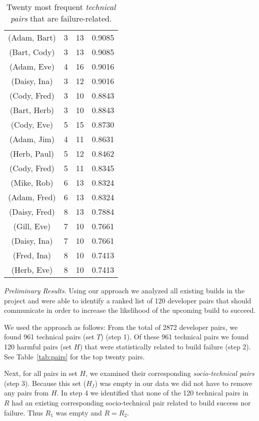 \begin{table}[t]
\begin{tabular}{@{\hspace{.2cm}}ccc@{\hspace{.75cm}}c@{\hspace{.2cm}}}
(Adam, Bart)	&	3&	13&	0.9085	\\ %
(Bart, Cody)	&	3&	13&	0.9085	\\ %
(Adam, Eve)	&	4&	16&	0.9016	\\ %
(Daisy, Ina)	&	3&	12&	0.9016	\\ %
(Cody, Fred)	&	3&	10&	0.8843	\\ %
(Bart, Herb)	&	3&	10&	0.8843	\\ %
(Cody, Eve)	&	5&	15&	0.8730	\\ %
(Adam, Jim)	&	4&	11&	0.8631	\\ %
(Herb, Paul)	&	5&	12&	0.8462	\\ %
(Cody, Fred)	&	5&	11&	0.8345	\\ %
(Mike, Rob)	&	6&	13&	0.8324	\\ %
(Adam, Fred)	&	6&	13&	0.8324	\\ %
(Daisy, Fred)	&	8&	13&	0.7884	\\ %
(Gill, Eve)		&	7&	10&	0.7661	\\ %
(Daisy, Ina)	&	7&	10&	0.7661	\\ %
(Fred, Ina)	&	8&	10&	0.7413	\\ %
(Herb, Eve)	&	8&	10&	0.7413	\\ %
\bottomrule
\end{tabular}
\caption{Twenty most frequent \emph{technical pairs} that are failure-related.}
\label{tab:badtechpairs}
\end{table}

\emph{Preliminary Results.}
Using our approach we analyzed all existing builds in the project and were able to identify a ranked list of 120 developer pairs that should communicate in order to increase the likelihood of the upcoming build to succeed. 

We used the approach as follows: From the total of 2872 developer pairs, we found 961 technical pairs (set $T$) (step 1).
Of these 961 technical pairs we found 120 harmful pairs (set $H$) that were statistically related to build failure (step 2). See Table~\ref{tab:pairs} for the top twenty  pairs.

Next, for all pairs in set $H$, we examined their corresponding \emph{socio-technical pairs} (step 3). Because this set ($H_f$) was empty in our data we did not have to remove any pairs from $H$. 
In step 4 we identified that none of the 120 technical pairs in $R$ had an existing corresponding socio-technical pair related to build success nor failure. Thus $R_1$ was empty and $R=R_2$. 

